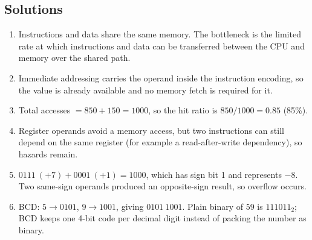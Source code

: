 \documentclass[11pt]{article}
\begin{document}
\subsection*{Solutions}
\begingroup\small
\begin{enumerate}[label=\arabic*.]
  \item Instructions and data share the same memory. The bottleneck is the
    limited rate at which instructions and data can be transferred between
    the CPU and memory over the shared path.
  \item Immediate addressing carries the operand inside the instruction
    encoding, so the value is already available and no memory fetch is
    required for it.
  \item Total accesses $=850+150=1000$, so the hit ratio is
    $850/1000 = 0.85$ (85\%).
  \item Register operands avoid a memory access, but two instructions can
    still depend on the same register (for example a read-after-write
    dependency), so hazards remain.
  \item $0111\ (+\!7) + 0001\ (+\!1) = 1000$, which has sign bit 1 and
    represents $-8$. Two same-sign operands produced an opposite-sign
    result, so overflow occurs.
  \item BCD: $5 \rightarrow 0101$, $9 \rightarrow 1001$, giving
    $0101\ 1001$. Plain binary of $59$ is $111011_2$; BCD keeps one 4-bit
    code per decimal digit instead of packing the number as binary.
\end{enumerate}
\endgroup
\end{document}
